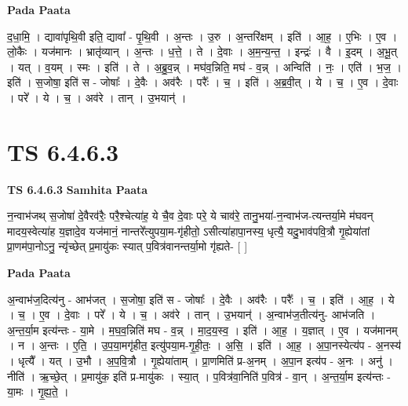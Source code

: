 \documentclass[17pt]{extarticle}
\begin{document}
\textbf{Pada Paata} \newline

द॒धा॒मि॒ । द्यावा॑पृथि॒वी इति॒ द्यावा᳚ - पृ॒थि॒वी । अ॒न्तः । उ॒रु । अ॒न्तरि॑क्षम् । इति॑ । आ॒ह॒ । ए॒भिः । ए॒व । लो॒कैः । यज॑मानः । भ्रातृ॑व्यान् । अ॒न्तः । ध॒त्ते॒ । ते । दे॒वाः । अ॒म॒न्य॒न्त॒ । इन्द्रः॑ । वै । इ॒दम् । अ॒भू॒त् । यत् । व॒यम् । स्मः । इति॑ । ते । अ॒ब्रु॒व॒न्न् । मघ॑व॒न्निति॒ मघ॑ - व॒न्न् । अन्विति॑ । नः॒ । एति॑ । भ॒ज॒ । इति॑ । स॒जोषा॒ इति॑ स - जोषाः᳚ । दे॒वैः । अव॑रैः । परैः᳚ । च॒ । इति॑ । अ॒ब्र॒वी॒त् । ये । च॒ । ए॒व । दे॒वाः । परे᳚ । ये । च॒ । अव॑रे । तान् । उ॒भयान्॑ ।  \newline




\section*{ TS 6.4.6.3 }

\textbf{TS 6.4.6.3 } \newline
\textbf{Samhita Paata} \newline

न॒न्वाभ॑जथ् स॒जोषा॑ दे॒वैरव॑रैः॒ परै॒श्चेत्या॑ह॒ ये चै॒व दे॒वाः परे॒ ये चाव॑रे॒ तानु॒भया॑-न॒न्वाभ॑ज-त्यन्तर्या॒मे म॑घवन् मादय॒स्वेत्या॑ह य॒ज्ञादे॒व यज॑मानं॒ नान्तरे᳚त्युपया॒म-गृ॑हीतो॒ ऽसीत्या॑हापा॒नस्य॒ धृत्यै॒ यदु॒भाव॑पवि॒त्रौ गृ॒ह्येया॑तां प्रा॒णम॑पा॒नोऽनु॒ न्यृ॑च्छेत् प्र॒मायु॑कः स्यात् प॒वित्र॑वानन्तर्या॒मो गृ॑ह्यते- [  ] \newline

\textbf{Pada Paata} \newline

अ॒न्वाभ॑ज॒दित्य॑नु - आभ॑जत् । स॒जोषा॒ इति॑ स - जोषाः᳚ । दे॒वैः । अव॑रैः । परैः᳚ । च॒ । इति॑ । आ॒ह॒ । ये । च॒ । ए॒व । दे॒वाः । परे᳚ । ये । च॒ । अव॑रे । तान् । उ॒भयान्॑ । अ॒न्वाभ॑ज॒तीत्य॑नु- आभ॑जति । अ॒न्त॒र्या॒म इत्य॑न्तः - या॒मे । म॒घ॒व॒न्निति॑ मघ - व॒न्न् । मा॒द॒य॒स्व॒ । इति॑ । आ॒ह॒ । य॒ज्ञात् । ए॒व । यज॑मानम् । न । अ॒न्तः । ए॒ति॒ । उ॒प॒या॒मगृ॑हीत॒ इत्यु॑पया॒म-गृ॒ही॒तः॒ । अ॒सि॒ । इति॑ । आ॒ह॒ । अ॒पा॒नस्येत्य॑प - अ॒नस्य॑ । धृत्यै᳚ । यत् । उ॒भौ । अ॒प॒वि॒त्रौ । गृ॒ह्येया॑ताम् । प्रा॒णमिति॑ प्र-अ॒नम् । अ॒पा॒न इत्य॑प - अ॒नः । अनु॑ । नीति॑ । ऋ॒च्छे॒त् । प्र॒मायु॑क॒ इति॑ प्र-मायु॑कः । स्या॒त् । प॒वित्र॑वा॒निति॑ प॒वित्र॑ - वा॒न् । अ॒न्त॒र्या॒म इत्य॑न्तः - या॒मः । गृ॒ह्य॒ते॒ ।  \newline




\end{document}
